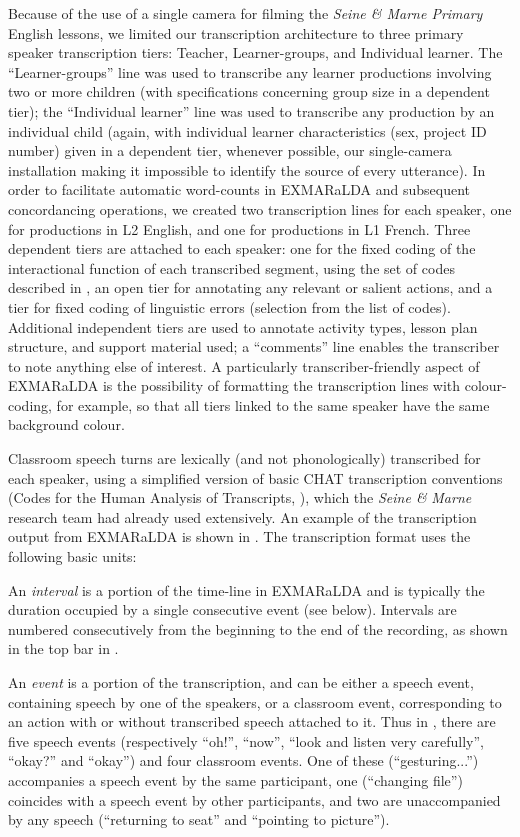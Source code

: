 \documentclass[output=paper,colorlinks,citecolor=brown,modfonts,nonflat]{../langscibook}
\begin{document}
Because of the use of a single camera for filming the \textit{Seine \& Marne Primary} English lessons, we limited our transcription architecture to three primary speaker transcription tiers: Teacher, Learner-groups, and Individual learner. The “Learner-groups” line was used to transcribe any learner productions involving two or more children (with specifications concerning group size in a dependent tier); the “Individual learner” line was used to transcribe any production by an individual child (again, with individual learner characteristics (sex, project ID number) given in a dependent tier, whenever possible, our single-camera installation making it impossible to identify the source of every utterance). In order to facilitate automatic word-counts in EXMARaLDA and subsequent concordancing operations, we created two transcription lines for each speaker, one for productions in L2 English, and one for productions in L1 French. Three dependent tiers are attached to each speaker: one for the fixed coding of the interactional function of each transcribed segment, using the set of codes described in , an open tier for annotating any relevant or salient actions, and a tier for fixed coding of linguistic errors (selection from the list of codes). Additional independent tiers are used to annotate activity types, lesson plan structure, and support material used; a “comments” line enables the transcriber to note anything else of interest. A particularly transcriber-friendly aspect of EXMARaLDA is the possibility of formatting the transcription lines with colour-coding, for example, so that all tiers linked to the same speaker have the same background colour.

Classroom speech turns are lexically (and not phonologically) transcribed for each speaker, using a simplified version of basic CHAT transcription conventions (Codes for the Human Analysis of Transcripts, \citealt{MacWhinney2000}), which the \textit{Seine \&} \textit{Marne} research team had already used extensively. An example of the transcription output from EXMARaLDA is shown in . The transcription format uses the following basic units:

An \textit{interval} is a portion of the time-line in EXMARaLDA and is typically the duration occupied by a single consecutive event (see below). Intervals are numbered consecutively from the beginning to the end of the recording, as shown in the top bar in .

An \textit{event} is a portion of the transcription, and can be either a speech event, containing speech by one of the speakers, or a classroom event, corresponding to an action with or without transcribed speech attached to it. Thus in , there are five speech events (respectively “oh!”, “now”, “look and listen very carefully”, “okay?” and “okay”) and four classroom events. One of these (“gesturing...”) accompanies a speech event by the same participant, one (“changing file”) coincides with a speech event by other participants, and two are unaccompanied by any speech (“returning to seat” and “pointing to picture”).
\end{document}
